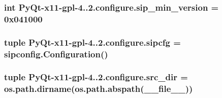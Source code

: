\subsubsection[{sip\+\_\+min\+\_\+version}]{\setlength{\rightskip}{0pt plus 5cm}int Py\+Qt-\/x11-\/gpl-\/4..\+2.configure.\+sip\+\_\+min\+\_\+version = 0x041000}\label{namespacePyQt-x11-gpl-4_811_82_1_1configure_afc8e751dbed90dfa56c853fab2c7ea0d}
\hypertarget{namespacePyQt-x11-gpl-4_811_82_1_1configure_a94c495e7961ff09074c85faefd8157ee}{}
\subsubsection[{sipcfg}]{\setlength{\rightskip}{0pt plus 5cm}tuple Py\+Qt-\/x11-\/gpl-\/4..\+2.configure.\+sipcfg = sipconfig.\+Configuration()}\label{namespacePyQt-x11-gpl-4_811_82_1_1configure_a94c495e7961ff09074c85faefd8157ee}
\hypertarget{namespacePyQt-x11-gpl-4_811_82_1_1configure_a55925707f92336448006957d79549012}{}
\subsubsection[{src\+\_\+dir}]{\setlength{\rightskip}{0pt plus 5cm}tuple Py\+Qt-\/x11-\/gpl-\/4..\+2.configure.\+src\+\_\+dir = os.\+path.\+dirname(os.\+path.\+abspath(\+\_\+\+\_\+file\+\_\+\+\_\+))}\label{namespacePyQt-x11-gpl-4_811_82_1_1configure_a55925707f92336448006957d79549012}
